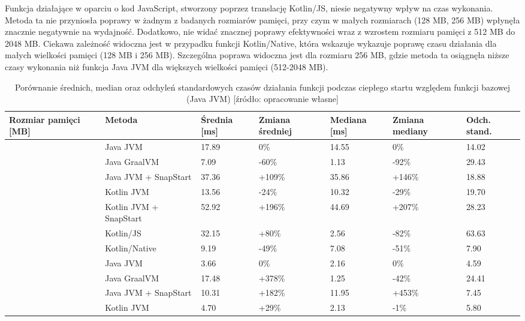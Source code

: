 Funkcja działające w oparciu o kod JavaScript, stworzony poprzez translację Kotlin/JS, niesie negatywny wpływ na czas wykonania.
Metoda ta nie przyniosła poprawy w żadnym z badanych rozmiarów pamięci, przy czym w małych rozmiarach (128 MB, 256 MB) wpłynęła znacznie negatywnie na wydajność.
Dodatkowo, nie widać znacznej poprawy efektywności wraz z wzrostem rozmiaru pamięci z 512 MB do 2048 MB. 
Ciekawa zależność widoczna jest w przypadku funkcji Kotlin/Native, która wskazuje wykazuje poprawę czasu działania dla małych wielkości pamięci (128 MB i 256 MB).
Szczególna poprawa widoczna jest dla rozmiaru 256 MB, gdzie metoda ta osiągnęła niższe czasy wykonania niż funkcja Java JVM dla większych wielkości pamięci (512-2048 MB).

\begin{table}[htbp]
\centering
\caption{Porównanie średnich, median oraz odchyleń standardowych czasów działania funkcji podczas ciepłego startu względem funkcji bazowej (Java JVM) [źródło: opracowanie własne]}
\small
\begin{tabular}{|>{\centering\arraybackslash}m{2cm}|l|p{1.5cm}|p{1.5cm}|p{1.5cm}|p{1.5cm}|p{1.5cm}|}
\toprule
Rozmiar pamięci [MB] & Metoda & Średnia [ms] & Zmiana średniej & Mediana [ms] & Zmiana mediany & Odch. stand. \\
\midrule
\multirow{7}{*}{128} & Java JVM & 17.89 & \mbox{0\%} & 14.55 & \mbox{0\%} & 14.02 \\
 & Java GraalVM & 7.09 & \mbox{-60\%} & 1.13 & \mbox{-92\%} & 29.43 \\
 & Java JVM + SnapStart & 37.36 & \mbox{+109\%} & 35.86 & \mbox{+146\%} & 18.88 \\
 & Kotlin JVM & 13.56 & \mbox{-24\%} & 10.32 & \mbox{-29\%} & 19.70 \\
 & Kotlin JVM + SnapStart & 52.92 & \mbox{+196\%} & 44.69 & \mbox{+207\%} & 28.23 \\
 & Kotlin/JS & 32.15 & \mbox{+80\%} & 2.56 & \mbox{-82\%} & 63.63 \\
 & Kotlin/Native & 9.19 & \mbox{-49\%} & 7.08 & \mbox{-51\%} & 7.90 \\
\midrule
\multirow{7}{*}{256} & Java JVM & 3.66 & \mbox{0\%} & 2.16 & \mbox{0\%} & 4.59 \\
 & Java GraalVM & 17.48 & \mbox{+378\%} & 1.25 & \mbox{-42\%} & 24.41 \\
 & Java JVM + SnapStart & 10.31 & \mbox{+182\%} & 11.95 & \mbox{+453\%} & 7.45 \\
 & Kotlin JVM & 4.70 & \mbox{+29\%} & 2.13 & \mbox{-1\%} & 5.80 \\

\end{tabular}
\end{table}
